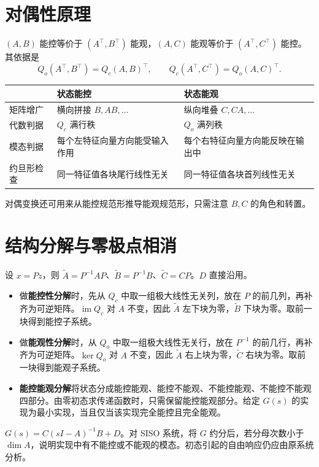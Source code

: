 \section{对偶性原理}

$(A,B)$ 能控等价于 $(A^\top,B^\top)$ 能观，$(A,C)$ 能观等价于 $(A^\top,C^\top)$ 能控。其依据是
\[
    Q_o(A^\top,B^\top)=Q_c(A,B)^\top,\qquad
    Q_c(A^\top,C^\top)=Q_o(A,C)^\top .
\]
\begin{center}
\renewcommand{\arraystretch}{1.38}
\begin{tabular}{@{}lll@{}}
\toprule
& 状态能控 & 状态能观\\
\midrule
矩阵增广 & 横向拼接 $B, AB,\ldots$ & 纵向堆叠 $C, CA,\ldots$\\
代数判据 & $Q_c$ 满行秩 & $Q_o$ 满列秩\\
模态判据 & 每个左特征向量方向能受输入作用 & 每个右特征向量方向能反映在输出中\\
约旦形检查 & 同一特征值各块尾行线性无关 & 同一特征值各块首列线性无关\\
\bottomrule
\end{tabular}
\end{center}
对偶变换还可用来从能控规范形推导能观规范形，只需注意 $B,C$ 的角色和转置。

\section{结构分解与零极点相消}

设 $x=Pz$，则 $\tilde A=P^{-1}AP$、$\tilde B=P^{-1}B$、$\tilde C=CP$。$D$ 直接沿用。
\begin{itemize}
    \item 做\textbf{能控性分解}时，先从 $Q_c$ 中取一组极大线性无关列，放在 $P$ 的前几列，再补齐为可逆矩阵。$\operatorname{im}Q_c$ 对 $A$ 不变，因此 $\tilde A$ 左下块为零，$\tilde B$ 下块为零。取前一块得到能控子系统。
    \item 做\textbf{能观性分解}时，从 $Q_o$ 中取一组极大线性无关行，放在 $P^{-1}$ 的前几行，再补齐为可逆矩阵。$\ker Q_o$ 对 $A$ 不变，因此 $\tilde A$ 右上块为零，$\tilde C$ 右块为零。取前一块得到能观子系统。
    \item \textbf{能控能观分解}将状态分成能控能观、能控不能观、不能控能观、不能控不能观四部分。由零初态求传递函数时，只需保留能控能观部分。给定 $G(s)$ 的实现为最小实现，当且仅当该实现完全能控且完全能观。
\end{itemize}

\begin{note}
    $G(s)=C(sI-A)^{-1}B+D$。对 SISO 系统，将 $G$ 约分后，若分母次数小于 $\dim A$，说明实现中有不能控或不能观的模态。初态引起的自由响应仍应由原系统分析。
\end{note}

